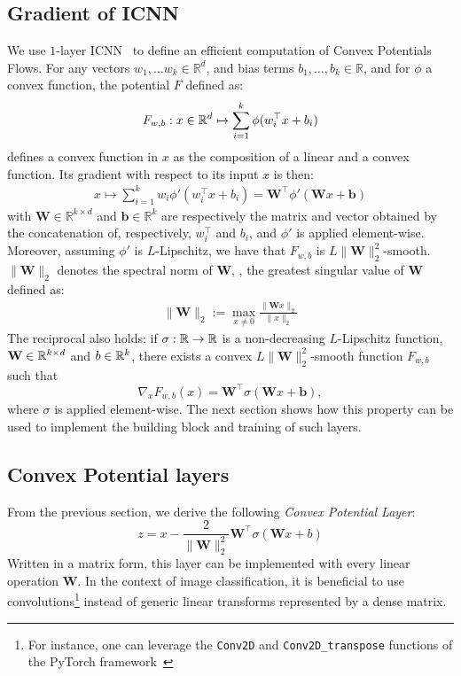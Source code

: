 \subsection{Gradient of ICNN}
We use $1$-layer ICNN~\citep{amos2017input} to define an efficient computation of Convex Potentials Flows. For any vectors $w_1,\dots w_k\in\mathbb{R}^d$, and bias terms  $b_1,\dots,b_k\in \mathbb{R}$, and for $\phi$ a convex function,  the potential $F$ defined as:
\begin{align*}
    F_{w,b}:x\in\mathbb{R}^d\mapsto \sum_{i=1}^k\phi( w_i^\top x+b_i)
\end{align*}
defines  a convex function in $x$ as the composition of a linear and a convex function. Its gradient with respect to its input $x$ is then:
\begin{align*}
    x\mapsto \sum_{i=1}^kw_i\phi'(w_i^\top x+b_i) = \mathbf{W}^\top \phi'(\mathbf{W} x+\mathbf{b})
\end{align*}
with $\mathbf{W}\in \mathbb{R}^{k\times d}$ and $\mathbf{b}\in\mathbb{R}^{k}$ are respectively the matrix and vector obtained by the concatenation of, respectively, $w_i^\top$ and $b_i$, and $\phi'$ is applied element-wise.  
Moreover, assuming $\phi'$ is $L$-Lipschitz, we have that $F_{w,b}$ is  $L\lVert\mathbf{W}\rVert_2^2$-smooth. $\lVert\mathbf{W}\rVert_2$ denotes the spectral norm of $\mathbf{W}$, \ie, the greatest singular value of $\mathbf{W}$ defined as:
\begin{align*}
   \lVert\mathbf{W}\rVert_2 :=\max_{x\neq 0} \frac{\lVert \mathbf{W}x\rVert_2}{\lVert x\rVert_2}
\end{align*}
The reciprocal also holds: if $\sigma:\mathbb{R}\to\mathbb{R}$ is a non-decreasing $L$-Lipschitz function, $\mathbf{W}\in \mathbb{R}^{k\times d}$ and $b\in \mathbb{R}^{k}$, there exists a convex $L\lVert\mathbf{W}\rVert_2^2$-smooth function $F_{w,b}$ such that 
$$\nabla_xF_{w,b}(x) =  \mathbf{W}^\top \sigma(\mathbf{W} x+\mathbf{b}),$$ where $\sigma$ is applied element-wise. The next section shows how this property can be used to implement the building block and training of such layers. 


\subsection{Convex Potential layers}
From the previous section, we derive the following \emph{Convex Potential Layer}: 
\begin{equation*}
\label{equation:stable_block}
  z = x - \frac{2}{\lVert \mathbf{W} \lVert_2^2} \mathbf{W}^\top \sigma(\mathbf{W} x + b)
\end{equation*}
Written in a matrix form, this layer can be implemented with every linear operation $\mathbf{W}$.
In the context of image classification, it is beneficial to use convolutions\footnote{For instance, one can leverage the \texttt{Conv2D} and \texttt{Conv2D\_transpose} functions of the PyTorch framework~\citep{paszke2019pytorch}} instead of generic linear transforms represented by a dense matrix. 

